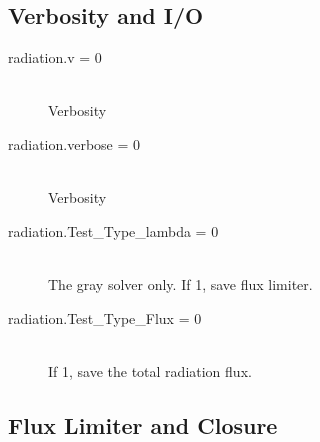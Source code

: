 \documentclass[11pt,letterpaper]{article}
\begin{document}
\subsection{Verbosity and I/O}
\label{sec:bothpar}

\begin{description}
\item[radiation.v = 0] \hfill \\
  Verbosity
\item[radiation.verbose = 0] \hfill \\
  Verbosity
\item[radiation.Test\_Type\_lambda = 0] \hfill \\
  The gray solver only.  If 1, save flux limiter.
\item[radiation.Test\_Type\_Flux = 0] \hfill \\
  If 1, save the total radiation flux.
\end{description}


\subsection{Flux Limiter and Closure}
\end{document}
